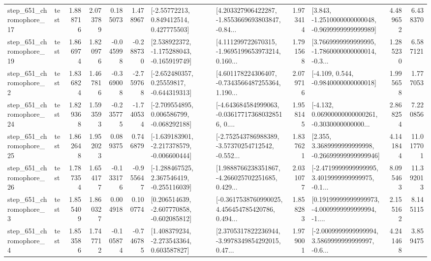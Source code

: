 \begin{tabular}{llrrrrllrlrr}
  step\_651\_chromophore\_17 &      test &      1.888716 &    2.073789 &      0.185073 &  1.478967 &     [-2.55772213, 0.849412514, 0.427775503] &  [4.203327906422287, -1.8553669693803847, -0.84... &       1.973414 &  [3.843, -1.2510000000000048, -0.9699999999999989] &            4.489652 &          6.438370 \\
  step\_651\_chromophore\_19 &      test &      1.866974 &    1.820976 &     -0.045998 & -0.288730 &   [2.538922372, -1.175288043, -0.165919749] &  [4.111299722670315, -1.9695199653973214, 0.160... &       1.791568 &  [3.7669999999999995, -1.7860000000000014, -0.3... &            1.285230 &          6.587121 \\
   step\_651\_chromophore\_2 &      test &      1.836824 &    1.467816 &     -0.369008 & -2.759768 &    [-2.652480357, 0.25559817, -0.644319313] &  [4.601178224306407, -0.7343566487255364, 1.190... &       2.079716 &               [-4.109, 0.544, -0.9840000000000018] &            1.995658 &          1.777053 \\
  step\_651\_chromophore\_24 &      test &      1.829368 &    1.593593 &     -0.235775 & -1.740534 &   [-2.709554895, 0.006586799, -0.068292188] &  [-4.643684584999063, -0.036177173680328516, 0.... &       1.958145 &  [-4.132, 0.06900000000000261, -0.3030000000000... &            2.868254 &          7.220856 \\
  step\_651\_chromophore\_25 &      test &      1.862648 &    1.952023 &      0.089375 &  0.746879 &  [-1.639183901, -2.217378579, -0.006600444] &  [-2.752543786988389, -3.57370254712542, -0.552... &       1.837621 &  [2.355, 3.3689999999999998, -0.26699999999999946] &            4.141844 &         11.017701 \\
  step\_651\_chromophore\_26 &      test &      1.787354 &    1.654177 &     -0.133176 & -0.955647 &   [-1.288467525, 2.367546419, -0.255116039] &  [1.9888766238351867, -4.266025702251685, 0.429... &       2.031077 &  [-2.4719999999999995, 3.4019999999999975, -0.1... &            8.095463 &         11.392013 \\
   step\_651\_chromophore\_3 &      test &      1.855409 &    1.860327 &      0.004918 &  0.100774 &   [0.206514639, -2.607770858, -0.602085812] &  [-0.3617538760990025, 4.456454785420786, 0.494... &       1.858283 &  [0.19199999999999973, -4.0009999999999994, -1.... &            2.155162 &          8.145115 \\
   step\_651\_chromophore\_4 &      test &      1.853586 &    1.747712 &     -0.105874 & -0.746785 &    [1.408379234, -2.273543364, 0.603587827] &  [2.3705317822236944, -3.9978349854292015, 0.47... &       1.979001 &  [-2.0009999999999994, 3.5869999999999997, -0.6... &            4.241468 &          3.859475 \\

\end{tabular}
